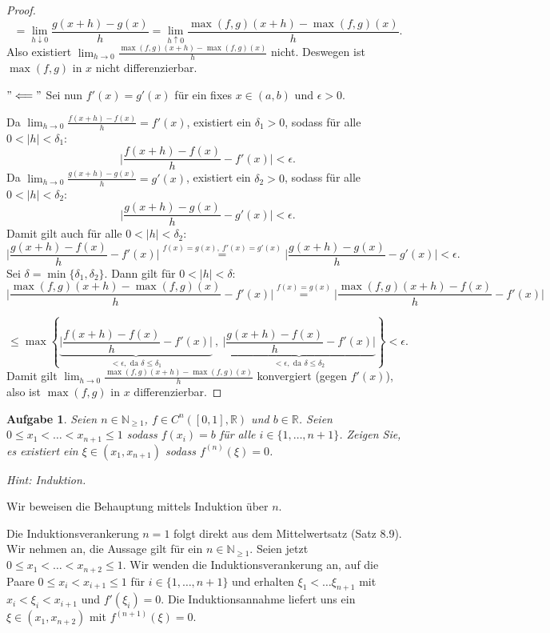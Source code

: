 \documentclass[a4paper, 20]{exam}
\newtheorem{ex}{Aufgabe}
\newcommand\RR{\mathbb{R}}
\newcommand\NN{\mathbb{N}}
\begin{document}
\begin{solution}
\begin{enumerate}[i.)]
\begin{proof}
$$= \lim_{h\downarrow 0} \frac{g(x+h) - g(x)}{h}
= \lim_{h\uparrow 0} \frac{\max(f,g)(x+h) - \max(f,g)(x)}{h}.$$
Also existiert $\lim_{h\rightarrow 0} \frac{\max(f,g)(x+h) - \max(f,g)(x)}{h}$ nicht. Deswegen ist $\max(f,g)$ in $x$ nicht differenzierbar.

$"\Longleftarrow"$ Sei nun $f'(x)=g'(x)$ f\"ur ein fixes $x\in (a,b)$ und $\epsilon>0$.

Da $\lim_{h \rightarrow 0} \frac{f(x+h)-f(x)}{h}=f'(x)$, existiert ein $\delta_1>0$, sodass f\"ur alle $0 < \vert h \vert < \delta_1$:
$$ \bigg\vert \frac{f(x+h)-f(x)}{h} - f'(x) \bigg\vert < \epsilon.$$
Da $\lim_{h \rightarrow 0} \frac{g(x+h)-g(x)}{h}=g'(x)$, existiert ein $\delta_2>0$, sodass f\"ur alle $0 < \vert h \vert < \delta_2$:
$$ \bigg\vert \frac{g(x+h)-g(x)}{h} - g'(x) \bigg\vert < \epsilon.$$
Damit gilt auch f\"ur alle $0 < \vert h \vert < \delta_2$:
$$ \bigg\vert \frac{g(x+h)-f(x)}{h} -f'(x)\bigg\vert 
\stackrel{f(x)=g(x), \ f'(x)=g'(x)}{=} \bigg\vert \frac{g(x+h)-g(x)}{h} - g'(x) \bigg\vert 
< \epsilon.$$
Sei $\delta=\min\{\delta_1, \delta_2 \}$. Dann gilt f\"ur $0<\vert h \vert <\delta$:
$$\bigg\vert \frac{\max(f,g)(x+h) - \max(f,g)(x)}{h} -f'(x)\bigg\vert 
\stackrel{f(x)=g(x)}{=} \bigg\vert \frac{\max(f,g)(x+h) - f(x)}{h} -f'(x)\bigg\vert$$

$$\leq \max \left\lbrace \underbrace{\bigg\vert \frac{f(x+h) - f(x)}{h} -f'(x)\bigg\vert}_{<\epsilon, \text{ da } \delta\leq \delta_1} \ , \ \underbrace{\bigg\vert \frac{g(x+h) - f(x)}{h} -f'(x)\bigg\vert}_{<\epsilon, \text{ da } \delta \leq \delta_2}  \right\rbrace 
< \epsilon.$$
Damit gilt $\lim_{h \rightarrow 0} \frac{\max(f,g)(x+h) - \max(f,g)(x)}{h}$ konvergiert (gegen $f'(x)$), also ist $\max(f,g)$ in $x$ differenzierbar.
\end{proof}
\end{enumerate}
\end{solution}


\begin{ex}
Seien $n \in \NN_{\geq 1}$, $f\in C^{n}([0,1], \RR)$ und $b\in \RR$. Seien $0\leq x_1< \dots < x_{n+1}\leq 1$ sodass $f(x_i)=b$ f\"ur alle $i\in \{1, \dots , n+1 \}$. Zeigen Sie, es existiert ein $\xi \in (x_1,x_{n+1})$ sodass $f^{(n)}(\xi)=0$.

Hint: Induktion.
\end{ex}
\begin{solution}
Wir beweisen die Behauptung mittels Induktion \"uber $n$.

Die Induktionsverankerung $n=1$ folgt direkt aus dem Mittelwertsatz (Satz 8.9). Wir nehmen an, die Aussage gilt f\"ur ein $n\in \NN_{\geq 1}$. Seien jetzt $0\leq x_1 < \dots < x_{n+2}\leq 1$.
Wir wenden die Induktionsverankerung an, auf die Paare $0\leq x_i < x_{i+1}\leq 1$ f\"ur $i \in \{ 1, \dots , n+1\}$ und erhalten $\xi_{1} < \dots \xi_{n+1}$ mit $x_{i} < \xi_{i} < x_{i+1}$ und 
$f'(\xi_i)=0$. Die Induktionsannahme liefert uns ein $\xi \in (x_1, x_{n+2})$ mit 
$f^{(n+1)}(\xi)=0$.
\end{solution}
\end{document}
